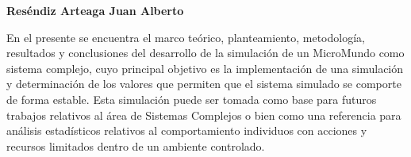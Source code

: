 \begin{titlepage}
\begin{center}
    \end{center}

    \vspace{1.5cm}

    \begin{center}

    \textbf{Reséndiz Arteaga Juan Alberto} \linebreak
    \end{center}

    \vspace{1.5cm}


    En el presente se encuentra el marco teórico, planteamiento, metodología, resultados y conclusiones del desarrollo de la simulación de un MicroMundo como sistema complejo, cuyo principal objetivo es la implementación de una simulación y determinación de los valores que permiten que el sistema simulado se comporte de forma estable. Esta simulación puede ser tomada como base para futuros trabajos relativos al área de Sistemas Complejos o bien como una referencia para análisis estadísticos relativos al comportamiento individuos con acciones y recursos limitados dentro de un ambiente controlado. \linebreak


    \vspace{1.5cm}

    \begin{center}

    \end{center}
\end{titlepage}
